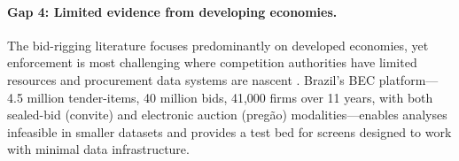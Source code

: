 \paragraph{Gap 4: Limited evidence from developing economies.}
The bid-rigging literature focuses predominantly on developed
economies, yet enforcement is most challenging where competition
authorities have limited resources and procurement data systems are
nascent \citep{sanchezgraells2019screening}. Brazil's BEC
platform---4.5 million tender-items, 40 million bids, 41,000 firms
over 11 years, with both sealed-bid (convite) and electronic auction
(preg\~ao) modalities---enables analyses infeasible in smaller
datasets and provides a test bed for screens designed to work with
minimal data infrastructure.
